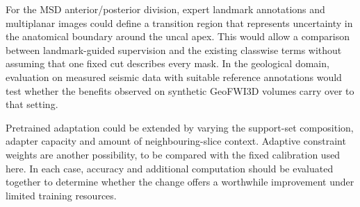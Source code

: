 \documentclass[12pt,a4paper]{article}
\begin{document}
For the MSD anterior/posterior division, expert landmark annotations
and multiplanar images could define a transition region that represents
uncertainty in the anatomical boundary around the uncal apex. This would
allow a comparison between landmark-guided supervision and the existing
classwise terms without assuming that one fixed cut describes every mask.
In the geological domain, evaluation on measured seismic data with
suitable reference annotations would test whether the benefits observed
on synthetic GeoFWI3D volumes carry over to that setting.

Pretrained adaptation could be extended by varying the support-set
composition, adapter capacity and amount of neighbouring-slice context.
Adaptive constraint weights are another possibility, to be compared with
the fixed calibration used here. In each case, accuracy and additional
computation should be evaluated together to determine whether the change
offers a worthwhile improvement under limited training resources.

\clearpage
\end{document}
